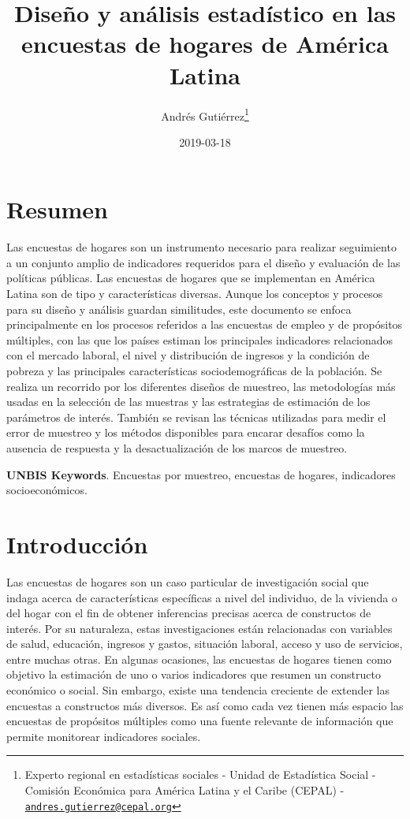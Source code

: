 \documentclass[12pt,spanish,]{book}
\title{Diseño y análisis estadístico en las encuestas de hogares de América Latina}
\author{Andrés Gutiérrez\footnote{Experto regional en estadísticas sociales - Unidad de Estadística Social - Comisión Económica para América Latina y el Caribe (CEPAL) - \href{mailto:andres.gutierrez@cepal.org}{\nolinkurl{andres.gutierrez@cepal.org}}}}
\date{2019-03-18}
\begin{document}
\maketitle

{
\hypersetup{linkcolor=black}
\setcounter{tocdepth}{1}
\tableofcontents
}
\listoftables
\listoffigures
\hypertarget{resumen}{%
\chapter*{Resumen}\label{resumen}}

Las encuestas de hogares son un instrumento necesario para realizar seguimiento a un conjunto amplio de indicadores requeridos para el diseño y evaluación de las políticas públicas. Las encuestas de hogares que se implementan en América Latina son de tipo y características diversas. Aunque los conceptos y procesos para su diseño y análisis guardan similitudes, este documento se enfoca principalmente en los procesos referidos a las encuestas de empleo y de propósitos múltiples, con las que los países estiman los principales indicadores relacionados con el mercado laboral, el nivel y distribución de ingresos y la condición de pobreza y las principales características sociodemográficas de la población. Se realiza un recorrido por los diferentes diseños de muestreo, las metodologías más usadas en la selección de las muestras y las estrategias de estimación de los parámetros de interés. También se revisan las técnicas utilizadas para medir el error de muestreo y los métodos disponibles para encarar desafíos como la ausencia de respuesta y la desactualización de los marcos de muestreo.

\textbf{UNBIS Keywords}. Encuestas por muestreo, encuestas de hogares, indicadores socioeconómicos.

\hypertarget{introduccion}{%
\chapter{Introducción}\label{introduccion}}

Las encuestas de hogares son un caso particular de investigación social que indaga acerca de características específicas a nivel del individuo, de la vivienda o del hogar con el fin de obtener inferencias precisas acerca de constructos de interés. Por su naturaleza, estas investigaciones están relacionadas con variables de salud, educación, ingresos y gastos, situación laboral, acceso y uso de servicios, entre muchas otras. En algunas ocasiones, las encuestas de hogares tienen como objetivo la estimación de uno o varios indicadores que resumen un constructo económico o social. Sin embargo, existe una tendencia creciente de extender las encuestas a constructos más diversos. Es así como cada vez tienen más espacio las encuestas de propósitos múltiples como una fuente relevante de información que permite monitorear indicadores sociales.
\end{document}
